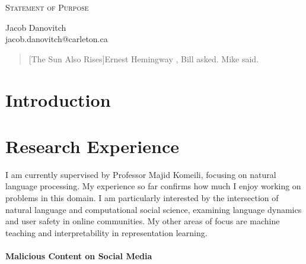 \documentclass[letterpaper]{article}
\makeatletter
\newcommand{\soptitle}{Statement of Purpose}
\newcommand{\yourname}{Jacob Danovitch}
\newcommand{\youremail}{jacob.danovitch@carleton.ca}
\makeatother
\begin{document}
\begin{center}{\LARGE \scshape \soptitle}\end{center}
\begin{center}\vspace{0.2em} {\large \yourname\\}
  {\youremail}\end{center}


\begin{center}
\begin{small}
\begin{quote}[The Sun Also Rises]{Ernest Hemingway}
    , Bill asked.  Mike said. 
\end{quote}
\end{small}
\end{center}

\section*{Introduction}


\section{Research Experience}
I am currently supervised by Professor Majid Komeili, focusing on natural language processing. My experience so far confirms how much I enjoy working on problems in this domain. I am particularly interested by the intersection of natural language and computational social science, examining language dynamics and user safety in online communities. My other areas of focus are machine teaching and interpretability in representation learning.


\paragraph{\textbf{Malicious Content on Social Media}}


\end{document}
